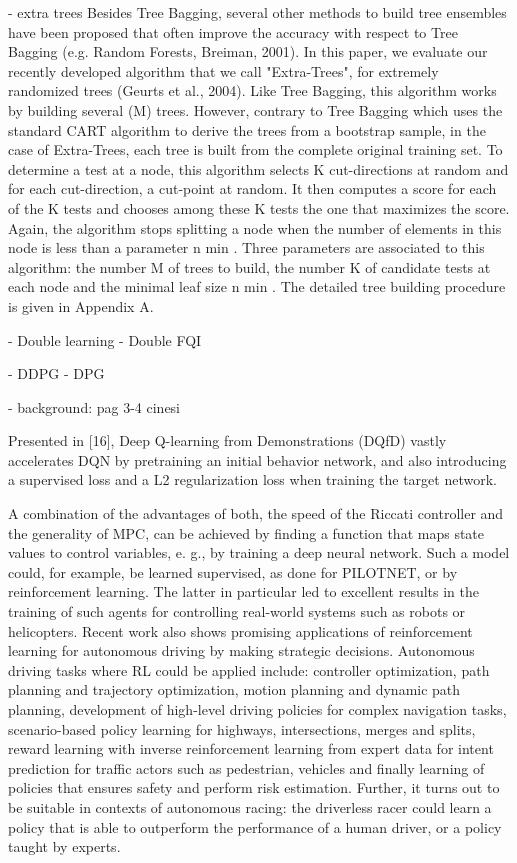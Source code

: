 - extra trees
	Besides Tree Bagging, several other methods to build tree ensembles have been proposed that often improve the accuracy with respect to Tree Bagging (e.g. Random Forests, Breiman, 2001). In this paper, we evaluate our recently developed algorithm that we call "Extra-Trees", for extremely randomized trees (Geurts et al., 2004). Like Tree Bagging, this algorithm works by building several (M) trees. However, contrary to Tree Bagging which uses the standard CART algorithm to derive the trees from a bootstrap sample, in the case of Extra-Trees, each tree is built from the complete original training set. To determine a test at a node, this algorithm selects K cut-directions at random and for each cut-direction, a cut-point at random. It then computes a score for each of the K tests and
chooses among these K tests the one that maximizes the score. Again, the algorithm stops splitting a node when the number of elements in this node is less than a parameter n min . Three parameters are associated to this algorithm: the number M of trees to build, the number K of candidate tests at each node and the minimal leaf size n min . The detailed tree building procedure is given in Appendix A.
	
	- Double learning
	- Double FQI

- DDPG
	- DPG
	



- background:
pag 3-4 cinesi



Presented in [16], Deep Q-learning from Demonstrations
(DQfD) vastly accelerates DQN by pretraining an initial
behavior network, and also introducing a supervised loss and
a L2 regularization loss when training the target network.

A combination of the advantages of both, the speed of the Riccati controller and the generality of MPC, can be achieved by finding a function that maps state values to control variables, e. g., by training a deep neural network. Such a model could, for example, be learned supervised, as done for PILOTNET, or by reinforcement learning. The latter in particular led to excellent results in the training of such agents for controlling real-world systems such as robots or helicopters.
Recent work also shows promising applications of reinforcement learning for autonomous driving by making strategic decisions. 
Autonomous driving tasks where RL could be applied include: controller optimization, path planning and trajectory optimization, motion planning and dynamic path planning, development of high-level driving policies for complex navigation tasks, scenario-based policy learning for highways, intersections, merges and splits, reward learning with inverse reinforcement learning from expert data for intent prediction for traffic actors such as pedestrian, vehicles and finally learning of policies that ensures safety and perform risk estimation. Further, it turns out to be suitable in contexts of autonomous racing: the driverless racer could learn a policy that is able to outperform the performance of a human driver, or a policy taught by experts.





